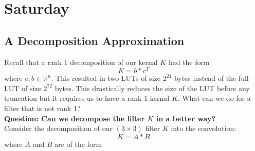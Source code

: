 \documentclass[12pt]{amsart}
\theoremstyle{definition}
\theoremstyle{remark}
\numberwithin{thm}{section}
\begin{document}
\section{Saturday}

\subsection{A Decomposition Approximation}
Recall that a rank 1 decomposition of our kernal $K$ had the form $$
K=b*c^T
$$
where $c,b \in \mathbb{R}^n$. This resulted in two LUTs of size $2^{24}$ bytes instead of the full LUT of size $2^{72}$ bytes. This drastically reduces the size of the LUT before any truncation but it requires us to have a rank 1 kernal $K$. What can we do for a filter that is not rank 1?
\\
\textbf{Question: Can we decompose the filter $K$ in a better way?}
\\
Consider the decomposition of our $(3\times 3)$ filter $K$ into the convolution:
$$K=A*B$$
where $A$ and $B$ are of the form
\end{document}
